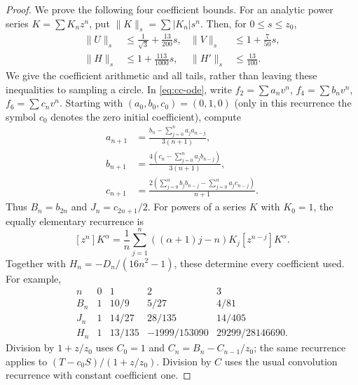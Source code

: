 \begin{proof}
We prove the following four coefficient bounds. For an analytic
power series $K=\sum K_nz^n$, put
$\|K\|_s=\sum|K_n|s^n$. Then, for $0\le s\le z_0$,
\begin{equation}\label{eq:cc-norms}
 \begin{aligned}
 \|U\|_s&\le\frac1{\sqrt3}+\frac{13}{200}s,&
 \|V\|_s&\le1+\frac7{50}s,\\
 \|H\|_s&\le1+\frac{113}{1000}s,&
 \|H'\|_s&\le\frac{13}{100}.
 \end{aligned}
\end{equation}
We give the coefficient arithmetic and all tails, rather than
leaving these inequalities to sampling a circle. In
\eqref{eq:cc-ode}, write $f_2=\sum a_nv^n$,
$f_4=\sum b_nv^n$, $f_6=\sum c_nv^n$. Starting with
$(a_0,b_0,c_0)=(0,1,0)$ (only in this recurrence the symbol
$c_0$ denotes the zero initial coefficient), compute
\begin{equation}\label{eq:cc-recurrence}
 \begin{aligned}
 a_{n+1}&=\frac{b_n-\sum_{j=0}^na_ja_{n-j}}{3(n+1)},\\
 b_{n+1}&=\frac{4(c_n-\sum_{j=0}^na_jb_{n-j})}{3(n+1)},\\
 c_{n+1}&=\frac{2(\sum_{j=0}^nb_jb_{n-j}-
                          \sum_{j=0}^na_jc_{n-j})}{n+1}.
 \end{aligned}
\end{equation}
Thus $B_n=b_{2n}$ and $J_n=c_{2n+1}/2$. For powers of a series
$K$ with $K_0=1$, the equally elementary recurrence is
\begin{equation}\label{eq:cc-power}
 [z^n]K^\alpha=\frac1n\sum_{j=1}^n
                 ((\alpha+1)j-n)K_j[z^{n-j}]K^\alpha.
\end{equation}
Together with $H_n=-D_n/(16n^2-1)$, these determine every
coefficient used. For example,
\[
 \begin{array}{c|rrrr}
 n&0&1&2&3\\ \hline
 B_n&1&10/9&5/27&4/81\\
 J_n&1&14/27&28/135&14/405\\
 H_n&1&13/135&-1999/153090&29299/28146690.
 \end{array}
\]
Division by $1+z/z_0$ uses $C_0=1$ and
$C_n=B_n-C_{n-1}/z_0$; the same recurrence applies to
$(T-c_0S)/(1+z/z_0)$. Division by $C$ uses the usual
convolution recurrence with constant coefficient one.


\end{proof}
